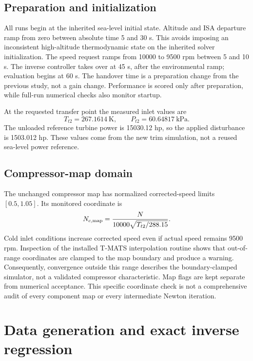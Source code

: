 \documentclass[11pt,a4paper]{article}
\begin{document}
\subsection{Preparation and initialization}
All runs begin at the inherited sea-level initial state. Altitude and ISA departure ramp from zero between absolute time 5 and 30 s. This avoids imposing an inconsistent high-altitude thermodynamic state on the inherited solver initialization. The speed request ramps from 10000 to 9500 rpm between 5 and 10 s. The inverse controller takes over at 45 s, after the environmental ramp; evaluation begins at 60 s. The handover time is a preparation change from the previous study, not a gain change. Performance is scored only after preparation, while full-run numerical checks also monitor startup.

At the requested transfer point the measured inlet values are
\begin{equation}
T_{t2}=267.1614\ \mathrm K,\qquad P_{t2}=60.64817\ \mathrm{kPa}.
\end{equation}
The unloaded reference turbine power is 15030.12 hp, so the applied disturbance is 1503.012 hp. These values come from the new trim simulation, not a reused sea-level power reference.

\subsection{Compressor-map domain}
The unchanged compressor map has normalized corrected-speed limits $[0.5,1.05]$. Its monitored coordinate is
\begin{equation}
N_{c,\rm map}=\frac{N}{10000\sqrt{T_{t2}/288.15}}.
\end{equation}
Cold inlet conditions increase corrected speed even if actual speed remains 9500 rpm. Inspection of the installed T-MATS interpolation routine shows that out-of-range coordinates are clamped to the map boundary and produce a warning. Consequently, convergence outside this range describes the boundary-clamped simulator, not a validated compressor characteristic. Map flags are kept separate from numerical acceptance. This specific coordinate check is not a comprehensive audit of every component map or every intermediate Newton iteration.

\clearpage
\section{Data generation and exact inverse regression}
\end{document}
